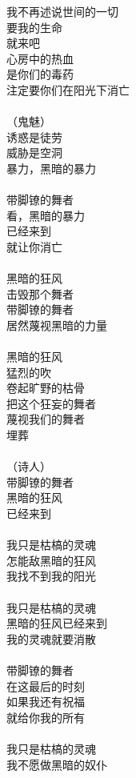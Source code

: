 我不再述说世间的一切\\
要我的生命\\
就来吧\\
心房中的热血\\
是你们的毒药\\
注定要你们在阳光下消亡\\
\\
（鬼魅）\\
诱惑是徒劳\\
威胁是空洞\\
暴力，黑暗的暴力\\
\\
带脚镣的舞者\\
看，黑暗的暴力\\
已经来到\\
就让你消亡\\
\\
黑暗的狂风\\
击毁那个舞者\\
带脚镣的舞者\\
居然蔑视黑暗的力量\\
\\
黑暗的狂风\\
猛烈的吹\\
卷起旷野的枯骨\\
把这个狂妄的舞者\\
蔑视我们的舞者\\
埋葬\\
\\
（诗人）\\
带脚镣的舞者\\
黑暗的狂风\\
已经来到\\
\\
我只是枯槁的灵魂\\
怎能敌黑暗的狂风\\
我找不到我的阳光\\
\\
我只是枯槁的灵魂\\
黑暗的狂风已经来到\\
我的灵魂就要消散\\
\\
带脚镣的舞者\\
在这最后的时刻\\
如果我还有祝福\\
就给你我的所有\\
\\
我只是枯槁的灵魂\\
我不愿做黑暗的奴仆\\
